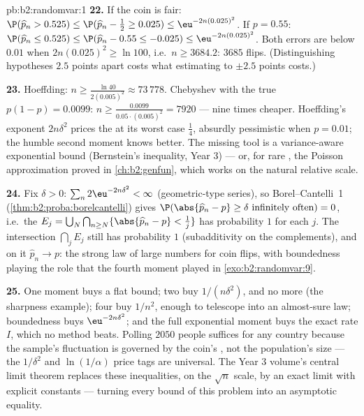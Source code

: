 \begin{solution}{pb:b2:randomvar:1}
\textbf{22.} If the coin is fair: $\P(\widehat p_n > 0.525)
\leq \P(\widehat p_n - \tfrac12 \geq 0.025) \leq
\eu^{-2n(0.025)^2}$. If $p = 0.55$: $\P(\widehat p_n \leq
0.525) \leq \P(\widehat p_n - 0.55 \leq -0.025) \leq
\eu^{-2n(0.025)^2}$. Both errors are below $0.01$ when
$2n(0.025)^2 \geq \ln 100$, i.e.\ $n \geq 3684.2$: $3685$
flips. (Distinguishing hypotheses $2.5$ points apart costs
what estimating to $\pm2.5$ points costs.)

\textbf{23.} Hoeffding: $n \geq \frac{\ln 40}{2(0.005)^2}
\approx 73\,778$. Chebyshev with the true  $p(1-p)
= 0.0099$: $n \geq \frac{0.0099}{0.05\cdot(0.005)^2} =
7920$ --- nine times cheaper. Hoeffding's exponent
$2n\delta^2$ prices the  at its worst case $\frac14$,
absurdly pessimistic when $p = 0.01$; the humble second
moment knows better. The missing tool is a variance-aware
exponential bound (Bernstein's inequality, Year 3) --- or,
for rare , the Poisson approximation proved in
\cref{ch:b2:genfun}, which works on the natural relative
scale.

\textbf{24.} Fix $\delta > 0$: $\sum_n 2\eu^{-2n\delta^2} <
\infty$ (geometric-type series), so Borel--Cantelli~1
(\cref{thm:b2:proba:borelcantelli}) gives
$\P(\abs{\widehat p_n - p} \geq \delta \text{ infinitely
often}) = 0$, i.e.\ the  $E_j =
\bigcup_N\bigcap_{n\geq N}\{\abs{\widehat p_n - p} <
\tfrac1j\}$ has probability $1$ for each $j$. The 
intersection $\bigcap_jE_j$ still has probability $1$
(subadditivity on the complements), and on it $\widehat p_n
\to p$: the strong law of large numbers for coin flips, with
boundedness playing the role that the fourth moment played in
\cref{exo:b2:randomvar:9}.

\textbf{25.} One moment buys a flat bound; two buy
$1/(n\delta^2)$, and no more (the sharpness example); four
buy $1/n^2$, enough to telescope into an almost-sure law;
boundedness buys $\eu^{-2n\delta^2}$; and the full
exponential moment buys the exact rate $I$, which no method
beats. Polling $2050$ people suffices for any country because
the sample's fluctuation is governed by the coin's ,
not the population's size --- the $1/\delta^2$ and
$\ln(1/\alpha)$ price tags are universal. The Year 3 volume's
central limit theorem replaces these inequalities, on the
$\sqrt n$ scale, by an exact limit  with explicit
constants --- turning every bound of this problem into an
asymptotic equality.
\end{solution}

